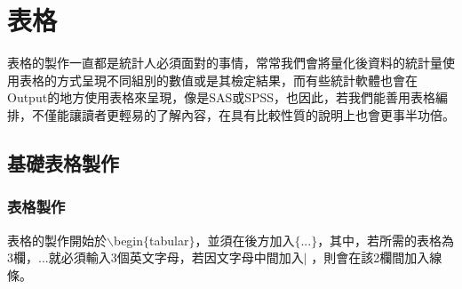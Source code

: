 %
%
%
\chapter{表格}
表格的製作一直都是統計人必須面對的事情，常常我們會將量化後資料的統計量使用表格的方式呈現不同組別的數值或是其檢定結果，而有些統計軟體也會在Output的地方使用表格來呈現，像是SAS或SPSS，也因此，若我們能善用表格編排，不僅能讓讀者更輕易的了解內容，在具有比較性質的說明上也會更事半功倍。
\section{基礎表格製作}
\subsection{表格製作}
表格的製作開始於$\backslash$begin$\{$tabular$\}$，並須在後方加入$\{$...$\}$，其中，若所需的表格為3欄，...就必須輸入3個英文字母，若因文字母中間加入$|$ ，則會在該2欄間加入線條。
\newpage
